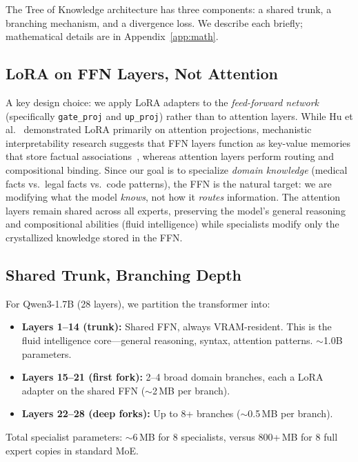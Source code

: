 \documentclass{article}
\newcommand{\tok}{Tree of Knowledge}
\begin{document}
The \tok{} architecture has three components: a shared trunk, a branching
mechanism, and a divergence loss. We describe each briefly; mathematical details
are in Appendix~\ref{app:math}.

\subsection{LoRA on FFN Layers, Not Attention}

A key design choice: we apply LoRA adapters to the \emph{feed-forward network}
(specifically \texttt{gate\_proj} and \texttt{up\_proj}) rather than to
attention layers. While Hu et al.~\cite{hu2022lora} demonstrated LoRA
primarily on attention projections, mechanistic interpretability research
suggests that FFN layers function as key-value memories that store factual
associations~\cite{geva2021transformer}, whereas attention layers perform
routing and compositional binding. Since our goal is to specialize
\emph{domain knowledge} (medical facts vs.\ legal facts vs.\ code patterns),
the FFN is the natural target: we are modifying what the model \emph{knows},
not how it \emph{routes} information. The attention layers remain shared across
all experts, preserving the model's general reasoning and compositional
abilities (fluid intelligence) while specialists modify only the crystallized
knowledge stored in the FFN.

\subsection{Shared Trunk, Branching Depth}

For Qwen3-1.7B (28 layers), we partition the transformer into:
\begin{itemize}
    \item \textbf{Layers 1--14 (trunk):} Shared FFN, always VRAM-resident.
          This is the fluid intelligence core---general reasoning, syntax,
          attention patterns. $\sim$1.0B parameters.
    \item \textbf{Layers 15--21 (first fork):} 2--4 broad domain branches,
          each a LoRA adapter on the shared FFN ($\sim$2\,MB per branch).
    \item \textbf{Layers 22--28 (deep forks):} Up to 8+ branches
          ($\sim$0.5\,MB per branch).
\end{itemize}
Total specialist parameters: $\sim$6\,MB for 8 specialists, versus 800+\,MB for
8 full expert copies in standard MoE.
\end{document}
